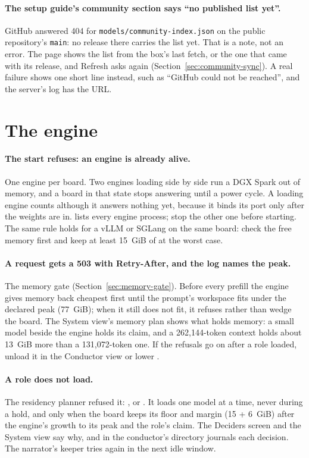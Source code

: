 \paragraph{The setup guide's community section says \enquote{no published list yet}.} GitHub answered 404 for \texttt{models/community-index.json} on the public repository's \texttt{main}: no release there carries the list yet. That is a note, not an error. The page shows the list from the box's last fetch, or the one that came with its release, and Refresh asks again (Section~\ref{sec:community-sync}). A real failure shows one short line instead, such as \enquote{GitHub could not be reached}, and the server's log has the URL.

\section{The engine}

\paragraph{The start refuses: an engine is already alive.} One engine per board. Two engines loading side by side run a DGX Spark out of memory, and a board in that state stops answering until a power cycle. A loading engine counts although it answers nothing yet, because it binds its port only after the weights are in.  lists every engine process; stop the other one before starting. The same rule holds for a vLLM or SGLang on the same board: check the free memory first and keep at least 15~GiB of  at the worst case.

\paragraph{A request gets a 503 with Retry-After, and the log names the peak.} The memory gate (Section~\ref{sec:memory-gate}). Before every prefill the engine gives memory back cheapest first until the prompt's workspace fits under the declared peak (77~GiB); when it still does not fit, it refuses rather than wedge the board. The System view's memory plan shows what holds memory: a small model beside the engine holds its claim, and a 262,144-token context holds about 13~GiB more than a 131,072-token one. If the refusals go on after a role loaded, unload it in the Conductor view or lower .

\paragraph{A role does not load.} The residency planner refused it: ,  or . It loads one model at a time, never during a hold, and only when the board keeps its floor and margin (15 + 6~GiB) after the engine's growth to its peak and the role's claim. The Deciders screen and the System view say why, and  in the conductor's directory journals each decision. The narrator's keeper tries again in the next idle window.

